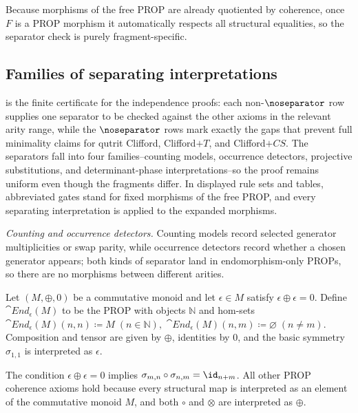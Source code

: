 Because morphisms of the free PROP are already quotiented by coherence, once \(F\) is a PROP morphism
it automatically respects all structural equalities, so the separator check is purely
fragment-specific.

\subsection{Families of separating interpretations}

 is the finite certificate for the independence proofs: each
non-\(\noseparator\) row supplies one separator to be checked against the other axioms in the
relevant arity range, while the \(\noseparator\) rows mark exactly the gaps that prevent full
minimality claims for qutrit Clifford, Clifford\(+T\), and Clifford\(+CS\).  The separators fall into
four families--counting models, occurrence detectors, projective substitutions, and
determinant-phase interpretations--so the proof remains uniform even though the fragments differ.
In displayed rule sets and tables, abbreviated gates stand for fixed morphisms of the free PROP, and
every separating interpretation is applied to the expanded morphisms.

\emph{Counting and occurrence detectors.}
Counting models record selected generator multiplicities or swap parity, while occurrence detectors
record whether a chosen generator appears; both kinds of separator land in endomorphism-only PROPs,
so there are no morphisms between different arities.

\begin{definition}\label{def:endM}
Let \((M,\oplus,0)\) be a commutative monoid and let \(\epsilon\in M\) satisfy
\(\epsilon\oplus\epsilon=0\).  Define \(\cat{End}_{\epsilon}(M)\) to be the PROP with objects
\(\mathbb{N}\) and hom-sets
\(
  \cat{End}_{\epsilon}(M)(n,n)\coloneqq M \; (n\in\mathbb{N}),
\)
\(
  \cat{End}_{\epsilon}(M)(n,m)\coloneqq \varnothing \; (n\neq m).
\)
Composition and tensor are given by \(\oplus\), identities by \(0\), and the basic symmetry
\(\sigma_{1,1}\) is interpreted as \(\epsilon\).
\end{definition}

\begin{remark}
The condition \(\epsilon\oplus\epsilon=0\) implies \(\sigma_{m,n}\circ\sigma_{n,m}=\id_{n+m}\).
All other PROP coherence axioms hold because every structural map is interpreted as an element of
the commutative monoid \(M\), and both \(\circ\) and \(\otimes\) are interpreted as \(\oplus\).
\end{remark}

